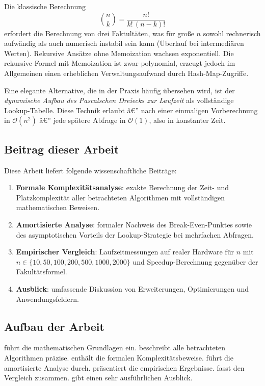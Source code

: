 ﻿\documentclass[12pt, a4paper]{article}
\newcommand{\Oh}{\mathcal{O}}
\theoremstyle{plain}
\theoremstyle{definition}
\theoremstyle{remark}
\renewcommand{\Oh}{\mathcal{O}}
\begin{document}
Die klassische Berechnung
\begin{equation}
  \binom{n}{k} = \frac{n!}{k!\,(n-k)!}
  \label{eq:klassisch}
\end{equation}
erfordert die Berechnung von drei Faktultäten, was für große $n$
sowohl rechnerisch aufwändig als auch numerisch instabil sein kann
(Überlauf bei intermediären Werten). Rekursive Ansätze ohne
Memoization wachsen exponentiell. Die rekursive Formel mit Memoization
ist zwar polynomial, erzeugt jedoch im Allgemeinen einen erheblichen
Verwaltungsaufwand durch Hash-Map-Zugriffe.

Eine elegante Alternative, die in der Praxis häufig übersehen wird,
ist der \emph{dynamische Aufbau des Pascalschen Dreiecks zur Laufzeit}
als vollständige Lookup-Tabelle. Diese Technik erlaubt â€” nach einer
einmaligen Vorberechnung in $\Oh(n^2)$ â€” jede spätere Abfrage in
$\Oh(1)$, also in konstanter Zeit.

\subsection{Beitrag dieser Arbeit}

Diese Arbeit liefert folgende wissenschaftliche Beiträge:
\begin{enumerate}[label=(\roman*)]
  \item \textbf{Formale Komplexitätsanalyse}: exakte Berechnung der
        Zeit- und Platzkomplexität aller betrachteten Algorithmen mit
        vollständigen mathematischen Beweisen.
  \item \textbf{Amortisierte Analyse}: formaler Nachweis des
        Break-Even-Punktes sowie des asymptotischen Vorteils der
        Lookup-Strategie bei mehrfachen Abfragen.
  \item \textbf{Empirischer Vergleich}: Laufzeitmessungen auf realer
        Hardware für $n$ mit $n \in \{10, 50, 100, 200, 500, 1000, 2000\}$ und
        Speedup-Berechnung gegenüber der Fakultätsformel.
  \item \textbf{Ausblick}: umfassende Diskussion von Erweiterungen,
        Optimierungen und Anwendungsfeldern.
\end{enumerate}

\subsection{Aufbau der Arbeit}

 führt die mathematischen Grundlagen ein.
 beschreibt alle betrachteten Algorithmen
präzise.  enthält die formalen
Komplexitätsbeweise.  führt die amortisierte
Analyse durch.  präsentiert die empirischen
Ergebnisse.  fasst den Vergleich zusammen.
 gibt einen sehr ausführlichen Ausblick.
\end{document}
